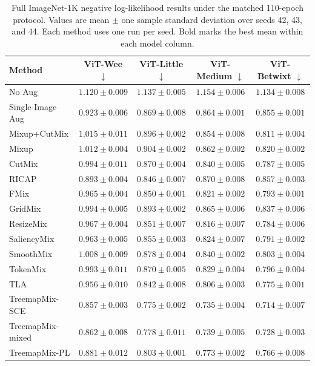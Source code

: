 \begin{table}[t]
  \caption{Full ImageNet-1K negative log-likelihood results under the matched 110-epoch protocol. Values are mean $\pm$ one sample standard deviation over seeds 42, 43, and 44. Each method uses one run per seed. Bold marks the best mean within each model column.}
  \label{tab:in1k-full-results-nll}
  \centering
  \footnotesize
  \setlength{\tabcolsep}{4pt}
  \begin{tabular}{@{}lcccc@{}}
    \toprule
    Method & ViT-Wee $\downarrow$ & ViT-Little $\downarrow$ & ViT-Medium $\downarrow$ & ViT-Betwixt $\downarrow$ \\
    \midrule
    No Aug & $1.120 \pm 0.009$ & $1.137 \pm 0.005$ & $1.154 \pm 0.006$ & $1.134 \pm 0.008$ \\
    Single-Image Aug & $0.923 \pm 0.006$ & $0.869 \pm 0.008$ & $0.864 \pm 0.001$ & $0.855 \pm 0.001$ \\
    Mixup+CutMix & $1.015 \pm 0.011$ & $0.896 \pm 0.002$ & $0.854 \pm 0.008$ & $0.811 \pm 0.004$ \\
    Mixup & $1.012 \pm 0.004$ & $0.904 \pm 0.002$ & $0.862 \pm 0.002$ & $0.820 \pm 0.002$ \\
    CutMix & $0.994 \pm 0.011$ & $0.870 \pm 0.004$ & $0.840 \pm 0.005$ & $0.787 \pm 0.005$ \\
    RICAP & $0.893 \pm 0.004$ & $0.846 \pm 0.007$ & $0.870 \pm 0.008$ & $0.857 \pm 0.003$ \\
    FMix & $0.965 \pm 0.004$ & $0.850 \pm 0.001$ & $0.821 \pm 0.002$ & $0.793 \pm 0.001$ \\
    GridMix & $0.994 \pm 0.005$ & $0.893 \pm 0.002$ & $0.865 \pm 0.006$ & $0.837 \pm 0.006$ \\
    ResizeMix & $0.967 \pm 0.004$ & $0.851 \pm 0.007$ & $0.816 \pm 0.007$ & $0.784 \pm 0.006$ \\
    SaliencyMix & $0.963 \pm 0.005$ & $0.855 \pm 0.003$ & $0.824 \pm 0.007$ & $0.791 \pm 0.002$ \\
    SmoothMix & $1.008 \pm 0.009$ & $0.878 \pm 0.004$ & $0.840 \pm 0.002$ & $0.803 \pm 0.004$ \\
    TokenMix & $0.993 \pm 0.011$ & $0.870 \pm 0.005$ & $0.829 \pm 0.004$ & $0.796 \pm 0.004$ \\
    TLA & $0.956 \pm 0.010$ & $0.842 \pm 0.008$ & $0.806 \pm 0.003$ & $0.775 \pm 0.001$ \\
    TreemapMix-SCE & $\mathbf{0.857 \pm 0.003}$ & $\mathbf{0.775 \pm 0.002}$ & $\mathbf{0.735 \pm 0.004}$ & $\mathbf{0.714 \pm 0.007}$ \\
    TreemapMix-mixed & $0.862 \pm 0.008$ & $0.778 \pm 0.011$ & $0.739 \pm 0.005$ & $0.728 \pm 0.003$ \\
    TreemapMix-PL & $0.881 \pm 0.012$ & $0.803 \pm 0.001$ & $0.773 \pm 0.002$ & $0.766 \pm 0.008$ \\
    \bottomrule
  \end{tabular}
\end{table}
